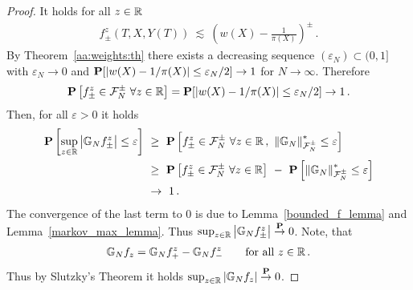\begin{proof}
  It holds for all $z\in\R$
  $
  $
  \begin{gather*}
  f^z_\pm
      (T,X,Y(T))
      \ 
      \lesssim
      \ 
     \left(
      w(X)- \frac{1}{\pi(X)}
      \right)
      ^\pm
      \,.
  \end{gather*}
  By Theorem~\ref{aa:weights:th}
  there exists a decreasing sequence 
  $(\varepsilon_N)\subset(0,1]$
  with $\varepsilon_N\to 0$
  and
  $
  \P[
\left| 
      w(X)- 1/\pi(X)
\right|
\le
\varepsilon_N/2
  ]
  \to 1
  $
  for $N\to\infty$.
  Therefore
  \begin{gather*}
  \P
  \left[
  f^z_\pm
  \in
  \mathcal{F}_N^\pm
  \
  \forall
  z\in\R
  \right]
    =
  \P[
\left| 
      w(X)- 1/\pi(X)
\right|
\le
\varepsilon_N/2
  ]
  \to 1
  \,.
  \end{gather*}
Then, for all $\varepsilon>0$ it holds
\begin{align*}
  \P
  \left[
  \sup_{z\in\R}
  \left| 
  \G_N
  f^z_\pm
  \right|
  \le \varepsilon
  \right]
  &
  \ 
  \ge
  \ 
  \P
  \left[
  f^z_\pm
  \in
  \mathcal{F}_N^\pm
  \
  \forall
  z\in\R
  \,,
  \ 
  \norm{\G_N}^*_{\mathcal{F}_N^\pm}
  \le \varepsilon
  \right]
  \\
  &
  \ 
  \ge
  \ 
  \P
  \left[
  f^z_\pm
  \in
  \mathcal{F}_N^\pm
  \
  \forall
  z\in\R
  \right]
  \ 
  -
  \ 
  \P
  \left[
  \norm{\G_N}^*_{\mathcal{F}_N^\pm}
  \le \varepsilon
  \right]
  \\
  &
  \ 
  \to
  \ 
  1
  \,.
\end{align*}
The convergence of the last term to 0 is due to 
Lemma~\ref{bounded_f_lemma} and Lemma~\ref{markov_max_lemma}.
Thus
  $\sup_{z\in\R}\left| \G_N f^z_\pm \right|\overset{\P}{\to}0$.
  Note, that 
  \begin{gather*}
\G_N f_z 
=
\G_N f^z_+
-
\G_N f^z_-
\qquad
\text{for all}\ 
z\in\R
\,.
  \end{gather*}
  Thus by Slutzky's Theorem\cite[Theorem~13.18]{Klenke2020}
  it holds
  $\sup_{z\in\R}\left| \G_N f_z \right|\overset{\P}{\to}0$.
\end{proof}
